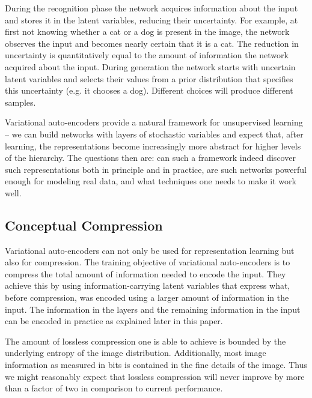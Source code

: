 \documentclass{article}
\begin{document}
During the recognition phase the network acquires information about the input and stores it in the latent variables, reducing their uncertainty. For example, at first not knowing whether a cat or a dog is present in the image, the network observes the input and becomes nearly certain that it is a cat. The reduction in uncertainty is quantitatively equal to the amount of information the network acquired about the input. During generation the network starts with uncertain latent variables and selects their values from a prior distribution that specifies this uncertainty (e.g. it chooses a dog). Different choices will produce different samples.






Variational auto-encoders provide a natural framework for unsupervised learning -- we can build networks with layers of stochastic variables and expect that, after learning, the representations become increasingly more abstract for higher levels of the hierarchy. The questions then are: can such a framework indeed discover such representations both in principle and in practice, are such networks powerful enough for modeling real data, and what techniques one needs to make it work well.



\subsection{Conceptual Compression}

Variational auto-encoders can not only be used for representation learning but also for compression. The training objective of variational auto-encoders is to compress the total amount of information needed to encode the input. They achieve this by using information-carrying latent variables that express what, before compression, was encoded using a larger amount of information in the input. The information in the layers and the remaining information in the input can be encoded in practice as explained later in this paper. 

The amount of lossless compression one is able to achieve is bounded by the underlying entropy of the image distribution. Additionally, most image information as measured in bits is contained in the fine details of the image. Thus we might reasonably expect that lossless compression will never improve by more than a factor of two in comparison to current performance. 
\end{document}
